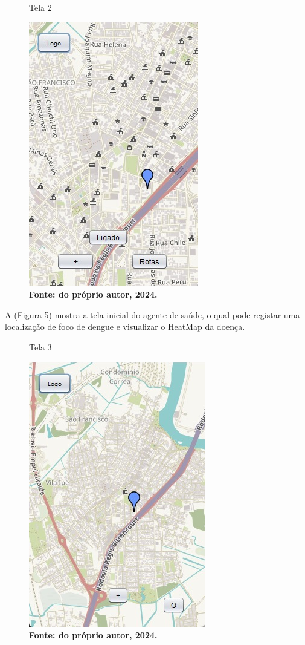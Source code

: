\begin{figure}[H]
    \centering
    \caption{Tela 2}
    \includegraphics[width=0.5\linewidth]{Illustrations/Adm.jpg}
    \caption*{\textbf{Fonte: do próprio autor, 2024.}}
\end{figure}

\vspace{12pt}

 A (Figura 5) mostra a tela inicial do agente de saúde, o qual pode registar uma localização de foco de dengue e visualizar o HeatMap da doença.
 
\begin{figure}[H]
    \centering
    \caption{Tela 3}
    \includegraphics[width=0.5\linewidth]{Illustrations/Agente.jpg}
    \caption*{\textbf{Fonte: do próprio autor, 2024.}}
\end{figure}

